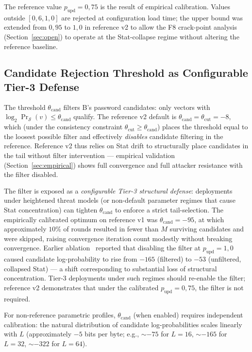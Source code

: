 \documentclass[11pt,a4paper]{article}
\begin{document}
The reference value $p_\text{upd} = 0{,}75$ is the result of empirical calibration. Values outside $[0{,}6, 1{,}0]$ are rejected at configuration load time; the upper bound was extended from $0{,}95$ to $1{,}0$ in reference v2 to allow the F8 crack-point analysis (Section~\ref{sec:open}) to operate at the Stat-collapse regime without altering the reference baseline.

\subsection{Candidate Rejection Threshold as Configurable Tier-3 Defense}\label{sec:cand-threshold}

The threshold $\theta_{\text{cand}}$ filters B's password candidates: only vectors with $\log_2 \Pr_\mathcal{S}(v) \leq \theta_{\text{cand}}$ qualify. The reference v2 default is $\theta_{\text{cand}} = \theta_{\text{cut}} = -8$, which (under the consistency constraint $\theta_{\text{cut}} \geq \theta_{\text{cand}}$) places the threshold equal to the loosest possible filter and effectively \emph{disables} candidate filtering in the reference. Reference v2 thus relies on Stat drift to structurally place candidates in the tail without filter intervention --- empirical validation (Section~\ref{sec:empirical}) shows full convergence and full attacker resistance with the filter disabled.

The filter is exposed as a \emph{configurable Tier-3 structural defense}: deployments under heightened threat models (or non-default parameter regimes that cause Stat concentration) can tighten $\theta_{\text{cand}}$ to enforce a strict tail-selection. The empirically calibrated optimum on reference v1 was $\theta_{\text{cand}} = -95$, at which approximately $10\%$ of rounds resulted in fewer than $M$ surviving candidates and were skipped, raising convergence iteration count modestly without breaking convergence. Earlier ablation~\cite{F4Calibration} reported that disabling the filter at $p_\text{upd} = 1{,}0$ caused candidate log-probability to rise from $-165$ (filtered) to $-53$ (unfiltered, collapsed Stat) --- a shift corresponding to substantial loss of structural concentration. Tier-3 deployments under such regimes should re-enable the filter; reference v2 demonstrates that under the calibrated $p_\text{upd} = 0{,}75$, the filter is not required.

For non-reference parametric profiles, $\theta_{\text{cand}}$ (when enabled) requires independent calibration: the natural distribution of candidate log-probabilities scales linearly with $L$ (approximately $-5$ bits per byte; e.g., $\sim -75$ for $L = 16$, $\sim -165$ for $L = 32$, $\sim -322$ for $L = 64$).
\end{document}
